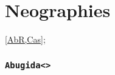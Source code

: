 \newpage
\part{Neographies}
\cref{AbR,Cas};

\newpage
\section{\texttt{Abugida<\NameAbR>}}


\newpage
\section{\NameCas}
